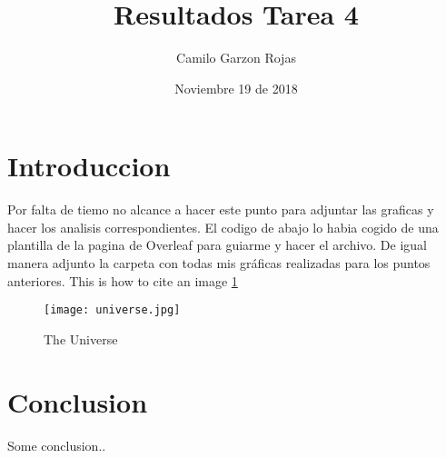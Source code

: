 \documentclass{article}
\title{Resultados Tarea 4}
\author{Camilo Garzon Rojas}
\date{Noviembre 19 de 2018}
\begin{document}
\maketitle

\section{Introduccion}
Por falta de tiemo no alcance a hacer este punto para adjuntar las graficas y hacer los analisis correspondientes. El codigo de abajo lo habia cogido de una plantilla de la pagina de Overleaf para guiarme y hacer el archivo. De igual manera adjunto la carpeta con todas mis gráficas realizadas para los puntos anteriores.
This is how to cite an image \ref{fig:universe}

\begin{figure}[h!]
\centering
\texttt{[image: universe.jpg]}
\caption{The Universe}
\label{fig:universe}
\end{figure}

\section{Conclusion}
Some conclusion..
\end{document}
